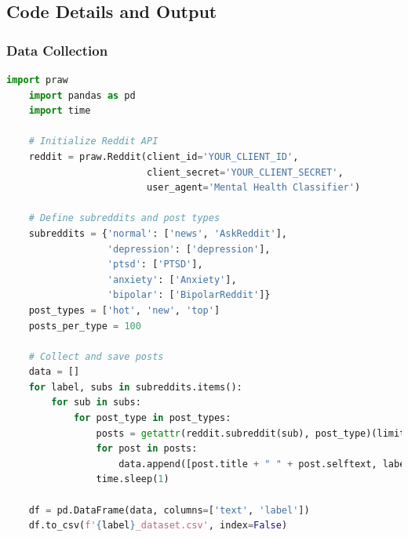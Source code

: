 \subsection{Code Details and Output}

\subsubsection{Data Collection}

\begin{tcolorbox}[colback=gray!5!white, colframe=gray!80!black, boxrule=0.5pt, title=Collecting Reddit Posts]
    \begin{lstlisting}[language=Python]
    import praw
    import pandas as pd
    import time
    
    # Initialize Reddit API
    reddit = praw.Reddit(client_id='YOUR_CLIENT_ID',
                         client_secret='YOUR_CLIENT_SECRET',
                         user_agent='Mental Health Classifier')
    
    # Define subreddits and post types
    subreddits = {'normal': ['news', 'AskReddit'], 
                  'depression': ['depression'], 
                  'ptsd': ['PTSD'], 
                  'anxiety': ['Anxiety'], 
                  'bipolar': ['BipolarReddit']}
    post_types = ['hot', 'new', 'top']
    posts_per_type = 100
    
    # Collect and save posts
    data = []
    for label, subs in subreddits.items():
        for sub in subs:
            for post_type in post_types:
                posts = getattr(reddit.subreddit(sub), post_type)(limit=posts_per_type)
                for post in posts:
                    data.append([post.title + " " + post.selftext, label])
                time.sleep(1)
    
    df = pd.DataFrame(data, columns=['text', 'label'])
    df.to_csv(f'{label}_dataset.csv', index=False)
    \end{lstlisting}
    \end{tcolorbox}
    
